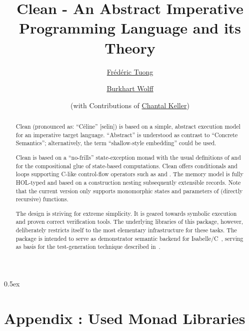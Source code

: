 \documentclass[fontsize=11pt,paper=a4,open=right,twoside,abstract=true]{scrreprt}
\newcommand{\HOL}{HOL}
\begin{document}
\title{Clean - An Abstract Imperative Programming Language and its Theory}
\author{%
  \href{https://www.lri.fr/~ftuong/}{Fr\'ed\'eric Tuong}
  \and
  \href{https://www.lri.fr/~wolff/}{Burkhart Wolff} \\
  \and
  (with Contributions of \href{https://www.lri.fr/~keller/}{Chantal Keller})}
\publishers{%
  \mbox{LRI, Univ. Paris-Sud, CNRS, Universit\'e Paris-Saclay} \\
  b\^at. 650 Ada Lovelace, 91405 Orsay, France \texorpdfstring{\\}{}
}

\maketitle

\begin{abstract}
Clean (pronounced as: ``Céline'' [selin]) is based on a simple, abstract execution model for an
imperative target language. ``Abstract'' is understood as contrast to ``Concrete Semantics'';
alternatively, the term ``shallow-style embedding'' could be used.

Clean is based on a ``no-frills'' state-exception monad with the usual definitions of  and
 for the compositional glue of state-based computations. Clean offers conditionals and
loops supporting C-like control-flow operators such as  and . The memory
model is fully \HOL{}-typed and based on a construction nesting subsequently extensible
records. Note that the current version only supports monomorphic states and parameters of (directly
recursive) functions.

The design is striving for extreme simplicity. It is geared towards symbolic execution and proven
correct verification tools. The underlying libraries of this package, however, deliberately
restricts itself to the most elementary infrastructure for these tasks. The package is intended to
serve as demonstrator semantic backend for Isabelle/C~\cite{TuongWolff19}, serving as basis for the
test-generation technique described in~\cite{DBLP:conf/tap/Keller18}.
\end{abstract}

\newpage
\tableofcontents

\parindent 0pt\parskip 0.5ex

% 
\newpage




\newpage
\chapter{Appendix : Used Monad Libraries}













\end{document}

